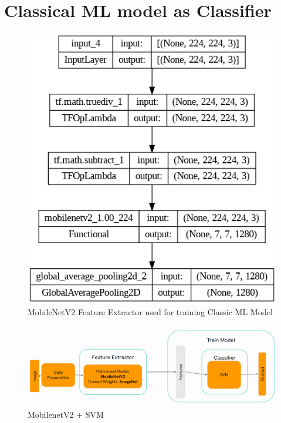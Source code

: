 
\section{Classical ML model as Classifier}

    \begin{figure}
        \centering
        \includegraphics[width=0.75\linewidth]{graphics//chapter5/moboilenetv2 feature extractor.png}
        \caption{MobileNetV2 Feature Extractor used for training Classic ML Model}
        \label{fig:mobnetv2-feature-extractor}
    \end{figure}

\begin{figure}
    \centering
    \includegraphics[width=1\linewidth]{graphics//chapter5/mobilenetV2 + SVM.png}
    \caption{MobilenetV2 + SVM}
    \label{fig:mobilenetv2-svm}
\end{figure}

